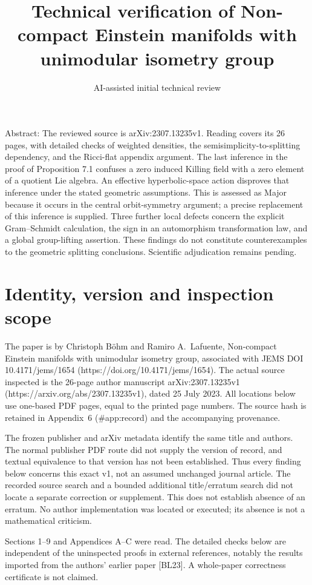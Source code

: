 \documentclass[10pt]{article}
\title{Technical verification of
Non-compact Einstein manifolds
with unimodular isometry group}
\author{AI-assisted initial technical review}
\date{}
\begin{document}
\maketitle
Abstract: The reviewed source is arXiv:2307.13235v1. Reading covers its 26 pages, with detailed checks of weighted densities, the semisimplicity-to-splitting dependency, and the Ricci-flat appendix argument. The last inference in the proof of Proposition 7.1 confuses a zero induced Killing field with a zero element of a quotient Lie algebra. An effective hyperbolic-space action disproves that inference under the stated geometric assumptions. This is assessed as Major because it occurs in the central orbit-symmetry argument; a precise replacement of this inference is supplied. Three further local defects concern the explicit Gram–Schmidt calculation, the sign in an automorphism transformation law, and a global group-lifting assertion. These findings do not constitute counterexamples to the geometric splitting conclusions. Scientific adjudication remains pending.\par
\section*{Identity, version and inspection scope}
The paper is by Christoph Böhm and Ramiro A. Lafuente, Non-compact Einstein manifolds with unimodular isometry group, associated with JEMS DOI 10.4171/jems/1654 (https://doi.org/10.4171/jems/1654). The actual source inspected is the 26-page author manuscript arXiv:2307.13235v1 (https://arxiv.org/abs/2307.13235v1), dated 25 July 2023. All locations below use one-based PDF pages, equal to the printed page numbers. The source hash is retained in Appendix 6 (\#app:record) and the accompanying provenance.\par
The frozen publisher and arXiv metadata identify the same title and authors. The normal publisher PDF route did not supply the version of record, and textual equivalence to that version has not been established. Thus every finding below concerns this exact v1, not an assumed unchanged journal article. The recorded source search and a bounded additional title/erratum search did not locate a separate correction or supplement. This does not establish absence of an erratum. No author implementation was located or executed; its absence is not a mathematical criticism.\par
Sections 1–9 and Appendices A–C were read. The detailed checks below are independent of the uninspected proofs in external references, notably the results imported from the authors’ earlier paper [BL23]. A whole-paper correctness certificate is not claimed.\par
\end{document}
